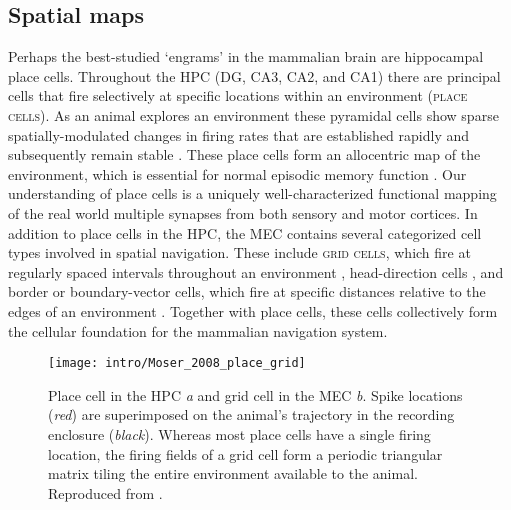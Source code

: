 \subsection{Spatial maps}
\label{sec:intro:memory:spatial_maps}
Perhaps the best-studied `engrams' in the mammalian brain are hippocampal place cells.
Throughout the \ac{HPC} (\ac{DG}, CA3, CA2, and CA1) there are principal cells that fire selectively at specific locations within an environment (\textsc{place cells}).
As an animal explores an environment these pyramidal cells show sparse spatially-modulated changes in firing rates that are established rapidly and subsequently remain stable \citep{O'Keefe1971, Thompson1990, Frank2004}.
These place cells form an allocentric map of the environment, which is essential for normal episodic memory function \citep{Smith2006c, Nakazawa2004, Buzsaki2013}.
Our understanding of place cells is a uniquely well-characterized functional mapping of the real world multiple synapses from both sensory and motor cortices.
In addition to place cells in the \ac{HPC}, the \ac{MEC} contains several categorized cell types involved in spatial navigation.
These include \textsc{grid cells}, which fire at regularly spaced intervals throughout an environment \citep{Hafting2005, Moser2014a}, head-direction cells \citep{Taube2007}, and border or boundary-vector cells, which fire at specific distances relative to the edges of an environment \citep{Solstad2008}.
Together with place cells, these cells collectively form the cellular foundation for the mammalian navigation system.

\begin{figure}
	\centering
	\texttt{[image: intro/Moser\_2008\_place\_grid]}
	\caption[Place cell in the \acs{HPC} and grid cell in the \acs{MEC}]{Place cell in the \acs{HPC} \textit{a} and grid cell in the \acs{MEC} \textit{b}.
	Spike locations (\emph{red}) are superimposed on the animal's trajectory in the recording enclosure (\emph{black}).
	Whereas most place cells have a single firing location, the firing fields of a grid cell form a periodic triangular matrix tiling the entire environment available to the animal.
	Reproduced from \citet{Moser2008}.}
	\label{fig:intro:memory:place_grid}
\end{figure}


